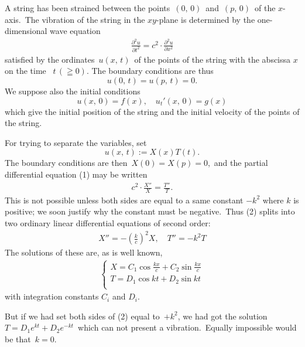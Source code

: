 \documentclass[12pt]{article}
\theoremstyle{definition}
\begin{document}

A string has been strained between the points\, $(0,\,0)$\, and\, $(p,\,0)$\, of the $x$-axis.\, The  vibration of the string in the $xy$-plane is determined by the one-dimensional wave equation
\begin{align} 
\frac{\partial^2u}{\partial t^2} = c^2\cdot\frac{\partial^2u}{\partial x^2}
\end{align}
satisfied by the ordinates\, $u(x,\,t)$\, of the points of the string with the  abscissa $x$ on the time \, $t\,(\geqq 0)$.
The boundary conditions are thus 
               $$u(0,\,t) = u(p,\,t) = 0.$$
We suppose also the initial conditions
   $$u(x,\,0) = f(x),\quad u_t'(x,\,0) = g(x)$$
which give the initial position of the string and the initial velocity of the points of the string.

For trying to separate the variables, set
                        $$u(x,\,t) := X(x)T(t).$$
The boundary conditions are then\, $X(0) = X(p) = 0$,\, and the partial differential equation (1) may be written
\begin{align}
c^2\cdot\frac{X''}{X} = \frac{T''}{T}.
\end{align}
This is not possible unless both sides are equal to a same constant $-k^2$ where $k$ is positive; we soon justify why the constant must be negative.\, Thus (2) splits into two ordinary linear differential equations of second order:
\begin{align}
X'' = -\left(\frac{k}{c}\right)^2 X,\quad T'' = -k^2T
\end{align}
The solutions of these are, as is well known,
\begin{align}
\begin{cases}
        X = C_1\cos\frac{kx}{c}+C_2\sin\frac{kx}{c}\\
        T = D_1\cos{kt}+D_2\sin{kt}\\
\end{cases}
\end{align}
with integration constants $C_i$ and $D_i$.

But if we had set both sides of (2) equal to\, $+k^2$, we had got the solution\, $T = D_1e^{kt}+D_2e^{-kt}$\, which can not present a vibration.\, Equally impossible would be that\, $k = 0$.
\end{document}
